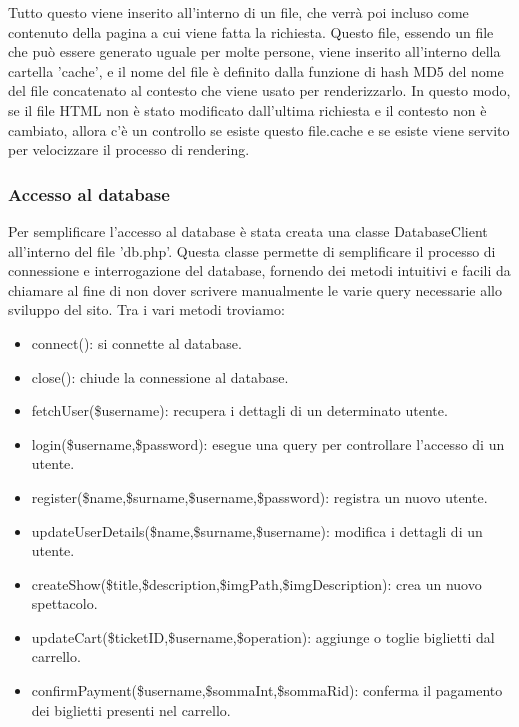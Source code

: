 Tutto questo viene inserito all'interno di un file, che verrà poi incluso come contenuto della pagina a cui viene fatta la richiesta. Questo file, essendo un file che può essere generato uguale per molte persone, viene inserito all'interno della cartella 'cache', e il nome del file è definito dalla funzione di hash MD5 del nome del file concatenato al contesto che viene usato per renderizzarlo. In questo modo, se il file HTML non è stato modificato dall'ultima richiesta e il contesto non è cambiato, allora c'è un controllo se esiste questo file.cache e se esiste viene servito per velocizzare il processo di rendering.

\subsubsection{Accesso al database}
Per semplificare l'accesso al database è stata creata una classe DatabaseClient all'interno del file 'db.php'. Questa classe permette di semplificare il processo di connessione e interrogazione del database, fornendo dei metodi intuitivi e facili da chiamare al fine di non dover scrivere manualmente le varie query necessarie allo sviluppo del sito.
Tra i vari metodi troviamo:
\begin{itemize}
    \item connect(): si connette al database.
    \item close(): chiude la connessione al database.
    \item fetchUser(\$username): recupera i dettagli di un determinato utente.
    \item login(\$username,\$password): esegue una query per controllare l'accesso di un utente.
    \item register(\$name,\$surname,\$username,\$password): registra un nuovo utente.
    \item updateUserDetails(\$name,\$surname,\$username): modifica i dettagli di un utente.
    \item createShow(\$title,\$description,\$imgPath,\$imgDescription): crea un nuovo spettacolo.
    \item updateCart(\$ticketID,\$username,\$operation): aggiunge o toglie biglietti dal carrello.
    \item confirmPayment(\$username,\$sommaInt,\$sommaRid): conferma il pagamento dei biglietti presenti nel carrello.
\end{itemize}
